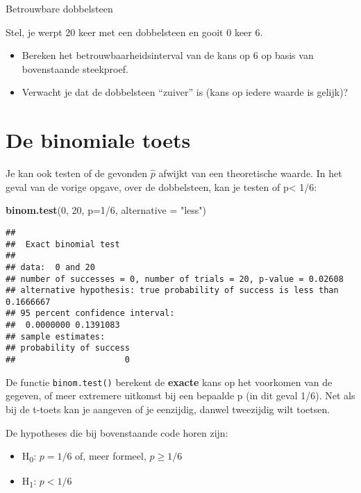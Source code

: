\documentclass[]{book}
\newenvironment{Shaded}{\begin{snugshade}}{\end{snugshade}}
\newcommand{\KeywordTok}[1]{\textcolor[rgb]{0.13,0.29,0.53}{\textbf{{#1}}}}
\newcommand{\DataTypeTok}[1]{\textcolor[rgb]{0.13,0.29,0.53}{{#1}}}
\newcommand{\DecValTok}[1]{\textcolor[rgb]{0.00,0.00,0.81}{{#1}}}
\newcommand{\StringTok}[1]{\textcolor[rgb]{0.31,0.60,0.02}{{#1}}}
\newcommand{\NormalTok}[1]{{#1}}
\providecommand{\tightlist}{%
  \setlength{\itemsep}{0pt}\setlength{\parskip}{0pt}}
\theoremstyle{definition}
\theoremstyle{definition}
\theoremstyle{definition}
\theoremstyle{remark}
\let\BeginKnitrBlock\begin \let\EndKnitrBlock\end
\begin{document}
\BeginKnitrBlock{exercise}
\protect\hypertarget{exr:dobbelsteen1}{}{\label{exr:dobbelsteen1}
}Betrouwbare dobbelsteen

Stel, je werpt 20 keer met een dobbelsteen en gooit 0 keer 6.

\begin{itemize}
\tightlist
\item
  Bereken het betrouwbaarheidsinterval van de kans op 6 op basis van
  bovenstaande steekproef.
\item
  Verwacht je dat de dobbelsteen ``zuiver'' is (kans op iedere waarde is
  gelijk)?
\end{itemize}
\EndKnitrBlock{exercise}

\section{De binomiale toets}\label{de-binomiale-toets}

Je kan ook testen of de gevonden \(\hat{p}\) afwijkt van een
theoretische waarde. In het geval van de vorige opgave, over de
dobbelsteen, kan je testen of p\textless{} 1/6:

\begin{Shaded}
\begin{Highlighting}[]
\KeywordTok{binom.test}\NormalTok{(}\DecValTok{0}\NormalTok{, }\DecValTok{20}\NormalTok{, }\DataTypeTok{p=}\DecValTok{1}\NormalTok{/}\DecValTok{6}\NormalTok{, }\DataTypeTok{alternative =} \StringTok{"less"}\NormalTok{)}
\end{Highlighting}
\end{Shaded}

\begin{verbatim}
## 
##  Exact binomial test
## 
## data:  0 and 20
## number of successes = 0, number of trials = 20, p-value = 0.02608
## alternative hypothesis: true probability of success is less than 0.1666667
## 95 percent confidence interval:
##  0.0000000 0.1391083
## sample estimates:
## probability of success 
##                      0
\end{verbatim}

De functie \texttt{binom.test()} berekent de \textbf{exacte} kans op het
voorkomen van de gegeven, of meer extremere uitkomst bij een bepaalde p
(in dit geval 1/6). Net als bij de t-toets kan je aangeven of je
eenzijdig, danwel tweezijdig wilt toetsen.

De hypotheses die bij bovenstaande code horen zijn:

\begin{itemize}
\tightlist
\item
  H\textsubscript{0}: \(p = 1/6\) of, meer formeel, \(p \geq 1/6\)
\item
  H\textsubscript{1}: \(p < 1/6\)
\end{itemize}
\end{document}
